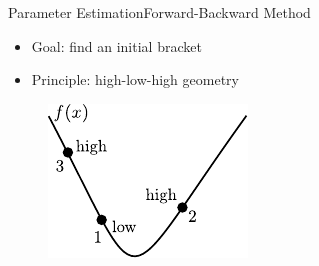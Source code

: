 \begin{frame}{Parameter Estimation}{Forward-Backward Method}
  \begin{itemize}
    \item Goal: find an initial bracket
    \item Principle: high-low-high geometry
  \end{itemize}
  \begin{figure}[H]
    \centering
    \includegraphics[scale=1.5]{Pictures/forward-backward.pdf}
  \end{figure}
\end{frame}


